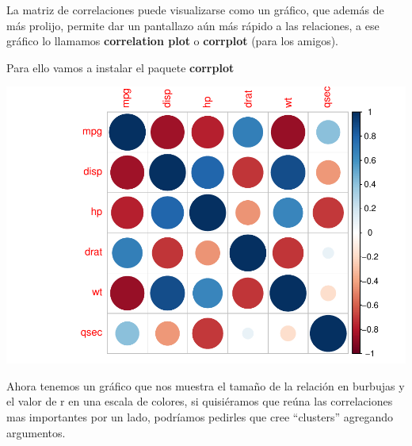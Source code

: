 \documentclass[
]{book}
\newenvironment{Shaded}{\begin{snugshade}}{\end{snugshade}}
\newcommand{\AttributeTok}[1]{\textcolor[rgb]{0.77,0.63,0.00}{#1}}
\newcommand{\CommentTok}[1]{\textcolor[rgb]{0.56,0.35,0.01}{\textit{#1}}}
\newcommand{\FunctionTok}[1]{\textcolor[rgb]{0.00,0.00,0.00}{#1}}
\newcommand{\NormalTok}[1]{#1}
\newcommand{\OtherTok}[1]{\textcolor[rgb]{0.56,0.35,0.01}{#1}}
\newcommand{\SpecialCharTok}[1]{\textcolor[rgb]{0.00,0.00,0.00}{#1}}
\newcommand{\StringTok}[1]{\textcolor[rgb]{0.31,0.60,0.02}{#1}}
\begin{document}
La matriz de correlaciones puede visualizarse como un gráfico, que además de más prolijo, permite dar un pantallazo aún más rápido a las relaciones, a ese gráfico lo llamamos \textbf{correlation plot} o \textbf{corrplot} (para los amigos).

Para ello vamos a instalar el paquete \textbf{corrplot}

\begin{Shaded}
\end{Shaded}

\includegraphics{Esatadistica_en_R_files/figure-latex/unnamed-chunk-221-1.pdf}

Ahora tenemos un gráfico que nos muestra el tamaño de la relación en burbujas y el valor de r en una escala de colores, si quisiéramos que reúna las correlaciones mas importantes por un lado, podríamos pedirles que cree ``clusters'' agregando argumentos.

\begin{Shaded}
\end{Shaded}
\end{document}
